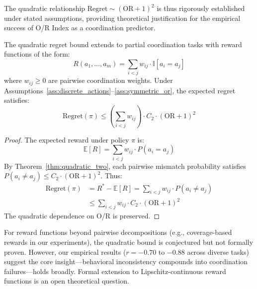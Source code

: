 The quadratic relationship $\text{Regret} \sim (\text{OR} + 1)^2$ is thus rigorously established under stated assumptions, providing theoretical justification for the empirical success of O/R Index as a coordination predictor.

\begin{corollary}
\label{cor:partial_coordination}
The quadratic regret bound extends to partial coordination tasks with reward functions of the form:
\begin{equation}
R(a_1, \ldots, a_m) = \sum_{i < j} w_{ij} \cdot \mathbb{I}[a_i = a_j]
\end{equation}
where $w_{ij} \geq 0$ are pairwise coordination weights. Under Assumptions~\ref{ass:discrete_actions}--\ref{ass:symmetric_or}, the expected regret satisfies:
\begin{equation}
\text{Regret}(\pi) \leq \left(\sum_{i < j} w_{ij}\right) \cdot C_2 \cdot (\text{OR} + 1)^2
\end{equation}
\end{corollary}

\begin{proof}
The expected reward under policy $\pi$ is:
\begin{equation}
\mathbb{E}[R] = \sum_{i < j} w_{ij} \cdot P(a_i = a_j)
\end{equation}
By Theorem~\ref{thm:quadratic_two}, each pairwise mismatch probability satisfies $P(a_i \neq a_j) \leq C_2 \cdot (\text{OR} + 1)^2$. Thus:
\begin{align}
\text{Regret}(\pi) &= R^* - \mathbb{E}[R] = \sum_{i < j} w_{ij} \cdot P(a_i \neq a_j) \\
&\leq \sum_{i < j} w_{ij} \cdot C_2 \cdot (\text{OR} + 1)^2
\end{align}
The quadratic dependence on O/R is preserved.
\end{proof}

\begin{remark}
\label{rem:general_rewards}
For reward functions beyond pairwise decompositions (e.g., coverage-based rewards in our experiments), the quadratic bound is conjectured but not formally proven. However, our empirical results ($r = -0.70$ to $-0.88$ across diverse tasks) suggest the core insight—behavioral inconsistency compounds into coordination failures—holds broadly. Formal extension to Lipschitz-continuous reward functions is an open theoretical question.
\end{remark}
